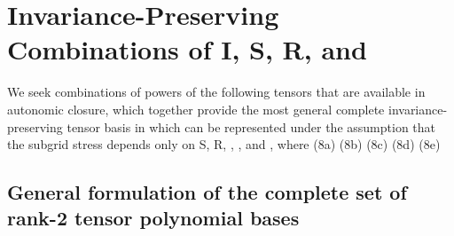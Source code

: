 \section{Invariance-Preserving Combinations of I, S, R,   and  }

We seek combinations of powers of the following tensors that are available in autonomic closure, which together provide the most general complete invariance-preserving tensor basis in which   can be represented under the assumption that the subgrid stress depends only on S, R,  ,  , and  , where
	 	(8a)
	 	(8b)
	 	(8c)
	 	(8d)
	 	(8e)

\subsection{General formulation of the complete set of rank-2 tensor polynomial bases}

